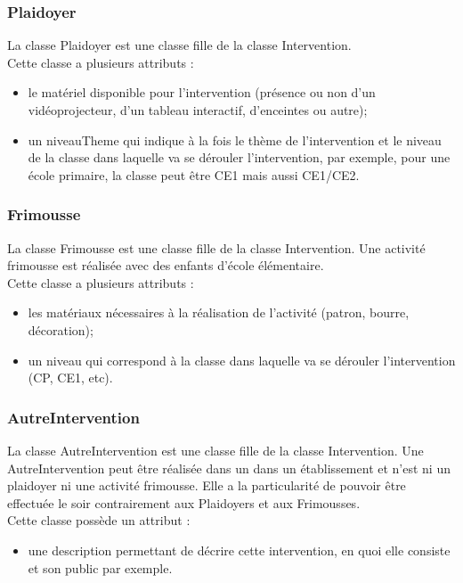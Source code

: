 \subsubsection*{Plaidoyer}
La classe Plaidoyer est une classe fille de la classe Intervention. \\
Cette classe a plusieurs attributs : 
\begin{itemize}
\item le matériel disponible pour l'intervention (présence ou non d'un vidéoprojecteur, d'un tableau interactif, d'enceintes ou autre);
\item un niveauTheme qui indique à la fois le thème de l'intervention et le niveau de la classe dans laquelle va se dérouler l'intervention, par exemple, pour une école primaire, la classe peut être CE1 mais aussi CE1/CE2.
\end{itemize}

\subsubsection*{Frimousse}
La classe Frimousse est une classe fille de la classe Intervention. Une activité frimousse est réalisée avec des enfants d'école élémentaire. \\
Cette classe a plusieurs attributs :
\begin{itemize}
\item les matériaux nécessaires à la réalisation de l'activité (patron, bourre, décoration);
\item un niveau qui correspond à la classe dans laquelle va se dérouler l'intervention (CP, CE1, etc).
\end{itemize}

\subsubsection*{AutreIntervention}
La classe AutreIntervention est une classe fille de la classe Intervention. Une AutreIntervention peut être réalisée dans un dans un établissement et n'est ni un plaidoyer ni une activité frimousse. Elle a la particularité de pouvoir être effectuée le soir contrairement aux Plaidoyers et aux Frimousses. \\
Cette classe possède un attribut :
\begin{itemize}
\item une description permettant de décrire cette intervention, en quoi elle consiste et son public par exemple.
\end{itemize}

